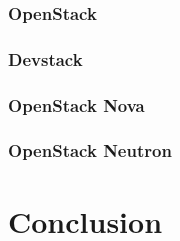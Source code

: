 \subsubsection{OpenStack}

\subsubsection{Devstack}

\subsubsection{OpenStack Nova}

\subsubsection{OpenStack Neutron}

\section{Conclusion}